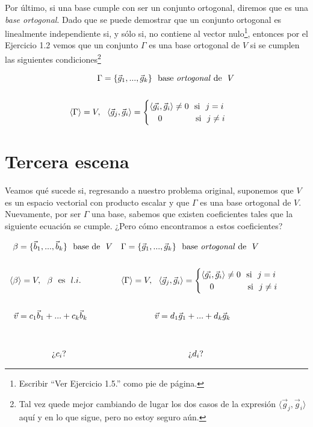 \documentclass[12pt,dvipsnames]{article}
\numberwithin{equation}{section}
\begin{document}
\noindent Por último, si una base cumple con ser un conjunto ortogonal, diremos que es una \emph{base ortogonal}. Dado que se puede demostrar que un conjunto ortogonal es linealmente independiente si, y sólo si, no contiene al vector nulo\footnote{Escribir ``Ver Ejercicio 1.5.'' como pie de página.}, entonces por el Ejercicio 1.2 vemos que un conjunto $\Gamma$ es una base ortogonal de $V$ si se cumplen las siguientes condiciones\footnote{Tal vez quede mejor cambiando de lugar los dos casos de la expresión $\langle \vec{g}_j , \vec{g}_i \rangle$ aquí y en lo que sigue, pero no estoy seguro aún.}

\begin{align*}
    \Gamma=\{\vec{g}_1,...,\vec{g}_k\} \ \ \text{base \emph{ortogonal} de} \ \ V& & &\\
    \\
    \langle\Gamma\rangle = V, \ \ \langle \vec{g}_j , \vec{g}_i \rangle = \begin{cases} \langle\vec{g_i}, \vec{g}_i\rangle\neq0 \ \ \text{si} \ \ j = i \\ \quad 0 \quad \ \ \ \ \ \ \ \ \ \text{si} \ \ j\neq i \end{cases}& & &\\
\end{align*}


\newpage
\section{Tercera escena}

Veamos qué sucede si, regresando a nuestro problema original, suponemos que $V$ es un espacio vectorial con producto escalar y que $\Gamma$ es una base ortogonal de $V$. Nuevamente, por ser $\Gamma$ una base, sabemos que existen coeficientes tales que la siguiente ecuación se cumple. ¿Pero cómo encontramos a estos coeficientes?

\begin{align*}
    \beta&=\{\vec{b}_1,...,\vec{b}_k\} \ \ \text{base de} \ \ V& &\Gamma=\{\vec{g}_1,...,\vec{g}_k\} \ \ \text{base \emph{ortogonal} de} \ \ V& & &\\
    \\
    \langle\beta&\rangle = V, \ \ \beta \ \ \text{es} \ \ l.i.& &\langle\Gamma\rangle = V, \ \ \langle \vec{g}_j , \vec{g}_i \rangle = \begin{cases} \langle\vec{g_i}, \vec{g}_i\rangle\neq0 \ \ \text{si} \ \ j = i \\ \quad 0 \quad \ \ \ \ \ \ \ \ \ \text{si} \ \ j\neq i \end{cases}& & &\\
    \\
    \vec{v}&= c_1\vec{b}_1 + ... + c_k\vec{b}_k& &\quad \quad \quad \quad \vec{v}= d_1\vec{g}_1 + ... + d_k\vec{g}_k& & & \\
    \\
    \\
    &\quad \quad \quad \quad \text{¿}c_i\text{?}& & \quad \quad \quad \quad \quad \quad \quad \quad \text{¿}d_i\text{?} & & &
\end{align*}
\end{document}
